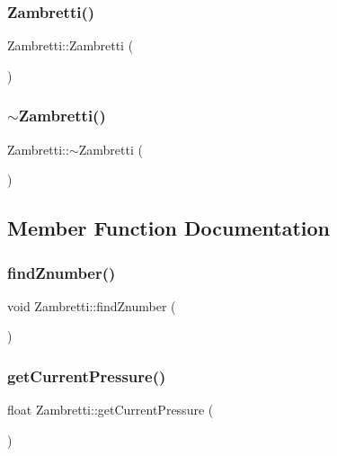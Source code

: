 \subsubsection{\texorpdfstring{Zambretti()}{Zambretti()}}
{\footnotesize\ttfamily Zambretti\+::\+Zambretti (\begin{DoxyParamCaption}{ }\end{DoxyParamCaption})}

\mbox{\label{class_zambretti_a3066f3c5d93f8d08c34fc3a838e6b7f7}} 
\subsubsection{\texorpdfstring{$\sim$\+Zambretti()}{~Zambretti()}}
{\footnotesize\ttfamily Zambretti\+::$\sim$\+Zambretti (\begin{DoxyParamCaption}{ }\end{DoxyParamCaption})}



\subsection{Member Function Documentation}
\mbox{\label{class_zambretti_a2722dff0af5aab457e344f9e4de0e6f2}} 
\subsubsection{\texorpdfstring{find\+Znumber()}{findZnumber()}}
{\footnotesize\ttfamily void Zambretti\+::find\+Znumber (\begin{DoxyParamCaption}{ }\end{DoxyParamCaption})}

\mbox{\label{class_zambretti_ab7f8a79fbd772925a9e41c5789826385}} 
\subsubsection{\texorpdfstring{get\+Current\+Pressure()}{getCurrentPressure()}}
{\footnotesize\ttfamily float Zambretti\+::get\+Current\+Pressure (\begin{DoxyParamCaption}{ }\end{DoxyParamCaption})}

